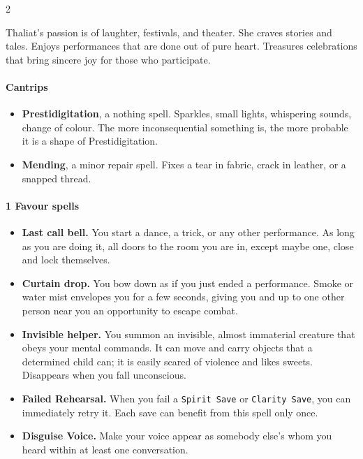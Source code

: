 

\begin{multicols*}{2}

Thaliat's passion is of laughter, festivals, and theater.
She craves stories and tales.
Enjoys performances that are done out of pure heart.
Treasures celebrations that bring sincere joy for those who participate.

\paragraph{Cantrips}
\begin{itemize}[nosep, leftmargin=*]
    \item[\ding{108}] \textbf{Prestidigitation}, a nothing spell. Sparkles, small lights, whispering sounds, change of colour.
 The more inconsequential something is, the more probable it is a shape of Prestidigitation.
    \item[\ding{108}] \textbf{Mending}, a minor repair spell. Fixes a tear in fabric, crack in leather, or a snapped thread.
\end{itemize}

\paragraph{1 Favour spells}
\begin{itemize}[nosep, leftmargin=*]
    \item[\ding{108}] \textbf{Last call bell.} You start a dance, a trick, or any other performance. As long as you are doing it, all doors to the room you are in, except maybe one, close and lock themselves.
    \item[\ding{108}] \textbf{Curtain drop.} You bow down as if you just ended a performance. Smoke or water mist envelopes you for a few seconds, giving you and up to one other person near you an opportunity to escape combat.
    \item[\ding{108}] \textbf{Invisible helper.} You summon an invisible, almost immaterial creature that obeys your mental commands. It can move and carry objects that a determined child can; it is easily scared of violence and likes sweets. Disappears when you fall unconscious.
    \item[\ding{108}] \textbf{Failed Rehearsal.} When you fail a \texttt{Spirit Save} or \texttt{Clarity Save}, you can immediately retry it. Each save can benefit from this spell only once.
    \item[\ding{108}] \textbf{Disguise Voice.} Make your voice appear as somebody else's whom you heard within at least one conversation.
\end{itemize}

\end{multicols*}
